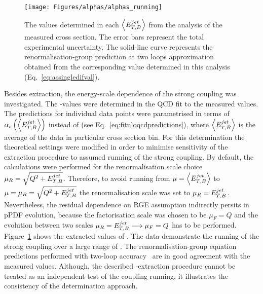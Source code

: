 \begin{figure}[t!]
 \centering
 \texttt{[image: Figures/alphas/alphas\_running]}
 \caption{The \as values determined in each $\left<\mbox{$E_{T,B}^{jet}$}\right>$ from the analysis of the measured \dsdetjetb cross section. The error bars represent the total experimental uncertainty. The solid-line curve represents the renormalisation-group prediction at two loops approximation obtained from the corresponding \asz value determined in this analysis (Eq.~\eqref{eq:assingledifval}).}
 \label{fig:asrunning}
\end{figure}
Besides \asz extraction, the energy-scale dependence of the strong coupling was investigated. The \as-values were determined in the QCD fit to the measured \dsdetjetb values. The predictions for individual \dsdetjetb data points were parametrised in terms of $\mbox{$\alpha_{s}$}\left(\left<\mbox{$E_{T,B}^{jet}$}\right>\right)$ instead of \asz (see Eq.~\eqref{eq:fitnloqcdpredictions}), where $\left<\mbox{$E_{T,B}^{jet}$}\right>$ is the average \etjetb of the data in particular cross section bin. For this determination the theoretical settings were modified in order to minimise sensitivity of the extraction procedure to assumed running of the strong coupling. By default, the calculations were performed for the renormalisation scale choice $\mu_R=\sqrt{\mbox{${Q^2}$}+\mbox{$E_{T,B}^{jet}$}}$. Therefore, to avoid running from $\mu=\left<\mbox{$E_{T,B}^{jet}$}\right>$ to $\mu=\mu_R=\sqrt{\mbox{${Q^2}$}+\mbox{$E_{T,B}^{jet}$}}$ the renormalisation scale was set to $\mu_R=\mbox{$E_{T,B}^{jet}$}$. Nevertheless, the residual dependence on RGE assumption indirectly persits in pPDF evolution, because the factorisation scale was chosen to be $\mu_F=Q$ and the evolution between two scales $\mu_R = \mbox{$E_{T,B}^{jet}$} \longrightarrow \mu_F = Q$ has to be performed. Figure~\ref{fig:asrunning} shows the extracted values of \as. The data demonstrate the running of the strong coupling over a large range of \etjetb. The renormalisation-group equation predictions performed with two-loop accuracy~\cite{Gross:1973id, Politzer:1973fx, Gross:1973ju, Politzer:1974fr} are in good agreement with the measured values. Although, the described \as-extraction procedure cannot be treated as an independent test of the coupling running, it illustrates the consistency of the \as determination approach.


